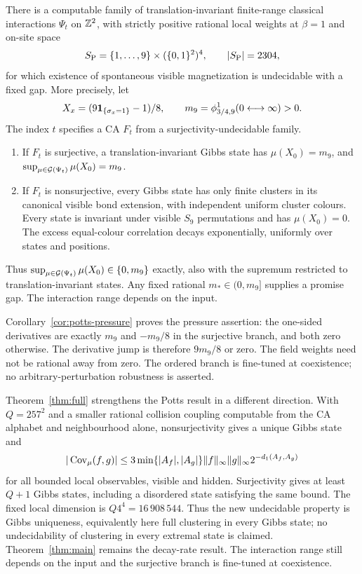 \begin{theoremE}\label{thm:potts-main}
There is a computable family of translation-invariant finite-range classical interactions $\Psi_t$ on $\mathbb Z^2$, with strictly positive rational local weights at $\beta=1$ and on-site space
\[
 S_{\rm P}=\{1,\ldots,9\}\times(\{0,1\}^2)^4,
 \qquad |S_{\rm P}|=2304,
\]
for which existence of spontaneous visible magnetization is undecidable with a fixed gap. More precisely, let
\[
 X_x=(9\mathbf 1_{\{\sigma_x=1\}}-1)/8,\qquad
 m_9=\phi^1_{3/4,9}(0\longleftrightarrow\infty)>0.
\]
The index $t$ specifies a CA $F_t$ from a surjectivity-undecidable family.
\begin{enumerate}[label=(\roman*)]
\item If $F_t$ is surjective, a translation-invariant Gibbs state has $\mu(X_0)=m_9$, and $\sup_{\mu\in\mathcal G(\Psi_t)}\mu(X_0)=m_9$.
\item If $F_t$ is nonsurjective, every Gibbs state has only finite clusters in its canonical visible bond extension, with independent uniform cluster colours. Every state is invariant under visible $S_9$ permutations and has $\mu(X_0)=0$. The excess equal-colour correlation decays exponentially, uniformly over states and positions.
\end{enumerate}
Thus $\sup_{\mu\in\mathcal G(\Psi_t)}\mu(X_0)\in\{0,m_9\}$ exactly, also with the supremum restricted to translation-invariant states. Any fixed rational $m_*\in(0,m_9]$ supplies a promise gap. The interaction range depends on the input.
\end{theoremE}

Corollary~\ref{cor:potts-pressure} proves the pressure assertion: the one-sided derivatives are exactly $m_9$ and $-m_9/8$ in the surjective branch, and both zero otherwise. The derivative jump is therefore $9m_9/8$ or zero. The field weights need not be rational away from zero. The ordered branch is fine-tuned at coexistence; no arbitrary-perturbation robustness is asserted.


Theorem~\ref{thm:full} strengthens the Potts result in a different direction. With $Q=257^2$ and a smaller rational collision coupling computable from the CA alphabet and neighbourhood alone, nonsurjectivity gives a unique Gibbs state and
\[
 |\operatorname{Cov}_\mu(f,g)|\le3\min\{|A_f|,|A_g|\}\|f\|_\infty\|g\|_\infty
 2^{-d_1(A_f,A_g)}
\]
for all bounded local observables, visible and hidden. Surjectivity gives at least $Q+1$ Gibbs states, including a disordered state satisfying the same bound. The fixed local dimension is $Q4^4=16\,908\,544$. Thus the new undecidable property is Gibbs uniqueness, equivalently here full clustering in every Gibbs state; no undecidability of clustering in every extremal state is claimed. Theorem~\ref{thm:main} remains the decay-rate result. The interaction range still depends on the input and the surjective branch is fine-tuned at coexistence.

